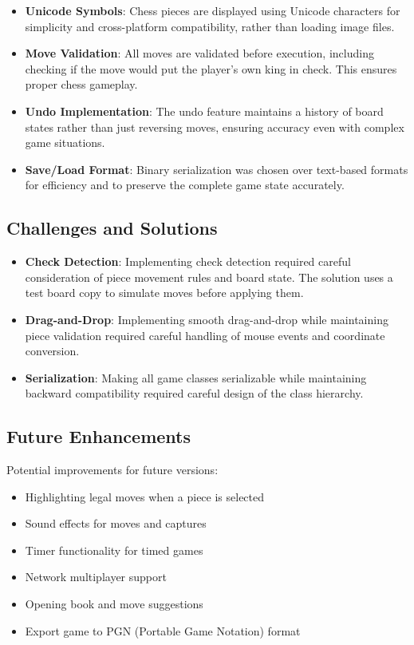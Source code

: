 \documentclass[12pt]{article}
\begin{document}
\begin{itemize}
    \item \textbf{Unicode Symbols}: Chess pieces are displayed using Unicode characters for simplicity and cross-platform compatibility, rather than loading image files.
    
    \item \textbf{Move Validation}: All moves are validated before execution, including checking if the move would put the player's own king in check. This ensures proper chess gameplay.
    
    \item \textbf{Undo Implementation}: The undo feature maintains a history of board states rather than just reversing moves, ensuring accuracy even with complex game situations.
    
    \item \textbf{Save/Load Format}: Binary serialization was chosen over text-based formats for efficiency and to preserve the complete game state accurately.
\end{itemize}

\subsection{Challenges and Solutions}

\begin{itemize}
    \item \textbf{Check Detection}: Implementing check detection required careful consideration of piece movement rules and board state. The solution uses a test board copy to simulate moves before applying them.
    
    \item \textbf{Drag-and-Drop}: Implementing smooth drag-and-drop while maintaining piece validation required careful handling of mouse events and coordinate conversion.
    
    \item \textbf{Serialization}: Making all game classes serializable while maintaining backward compatibility required careful design of the class hierarchy.
\end{itemize}

\subsection{Future Enhancements}

Potential improvements for future versions:
\begin{itemize}
    \item Highlighting legal moves when a piece is selected
    \item Sound effects for moves and captures
    \item Timer functionality for timed games
    \item Network multiplayer support
    \item Opening book and move suggestions
    \item Export game to PGN (Portable Game Notation) format
\end{itemize}
\end{document}

